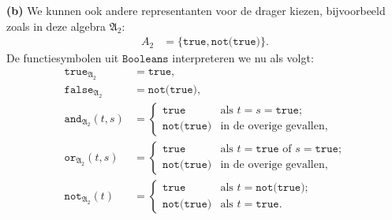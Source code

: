 \documentclass[a4paper,11pt]{article}
\begin{document}
\begin{description}
\item{\bf (b)} %
We kunnen ook andere representanten voor de drager kiezen, bijvoorbeeld zoals
in deze algebra $\mathfrak{A}_{2}$:
\begin{align*}
A_{2} &= \{\texttt{true}, \texttt{not(true)}\}.
\end{align*}
De functiesymbolen uit $\texttt{Booleans}$ interpreteren we nu als volgt:
\begin{align*}
\texttt{true}_{\mathfrak{A}_{2}}     &= \texttt{true}, \\
\texttt{false}_{\mathfrak{A}_{2}}    &= \texttt{not(true)}, \\
\texttt{and}_{\mathfrak{A}_{2}}(t,s) &= \begin{cases}
  \texttt{true}      & \text{als $t = s = \texttt{true}$;} \\
  \texttt{not(true)} & \text{in de overige gevallen},
\end{cases} \\
\texttt{or}_{\mathfrak{A}_{2}}(t,s) &= \begin{cases}
  \texttt{true}      & \text{als $t = \texttt{true}$ of $s = \texttt{true}$;} \\
  \texttt{not(true)} & \text{in de overige gevallen,}
\end{cases} \\
\texttt{not}_{\mathfrak{A}_{2}}(t) &= \begin{cases}
  \texttt{true}      & \text{als $t = \texttt{not(true)}$;} \\
  \texttt{not(true)} & \text{als $t = \texttt{true}$.}
\end{cases}
\end{align*}


\end{description}
\end{document}
